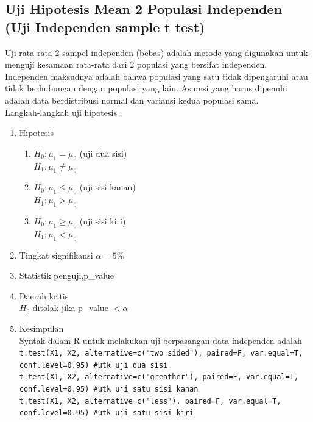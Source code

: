 \documentclass[a4paper,12pt]{article}
\begin{document}
\subsection{Uji Hipotesis Mean 2 Populasi Independen (Uji Independen sample t test)}
Uji rata-rata 2 sampel independen (bebas) adalah metode yang digunakan untuk menguji kesamaan rata-rata dari 2 populasi yang bersifat independen. Independen maksudnya adalah bahwa populasi
yang satu tidak dipengaruhi atau tidak berhubungan dengan populasi yang lain. Asumsi yang harus dipenuhi adalah data berdistribusi normal dan variansi kedua populasi sama.\\
Langkah-langkah uji hipotesis :\\
\begin{enumerate}
    \item Hipotesis
        \begin{enumerate}[label = \alph*.]
            \item $H_{0} : \mu_{1} = \mu_{0}$ (uji dua sisi)\\
                $H_{1} : \mu_{1} \neq \mu_{0}$

            \item $H_{0} : \mu_{1} \leq \mu_{0}$ (uji sisi kanan)\\
                $H_{1} : \mu_{1} > \mu_{0}$

            \item $H_{0} : \mu_{1} \geq \mu_{0}$ (uji sisi kiri)\\
                $H_{1} : \mu_{1} < \mu_{0}$

        \end{enumerate}

    \item Tingkat signifikansi $\alpha = 5\%$

    \item Statistik penguji,p\_value

    \item Daerah kritis\\
        $H_{0}$ ditolak jika p\_value $< \alpha$
        
    \item Kesimpulan\\
Syntak dalam R untuk melakukan uji berpasangan data independen adalah\\
\texttt{t.test(X1, X2, alternative=c("two sided"), paired=F, var.equal=T, conf.level=0.95) \#utk uji dua sisi}\\
    \texttt{t.test(X1, X2, alternative=c("greather"),  paired=F, var.equal=T, conf.level=0.95) \#utk uji satu sisi kanan}\\
    \texttt{t.test(X1, X2, alternative=c("less"),  paired=F, var.equal=T, conf.level=0.95) \#utk uji satu sisi kiri}\\
\end{enumerate}
\end{document}
